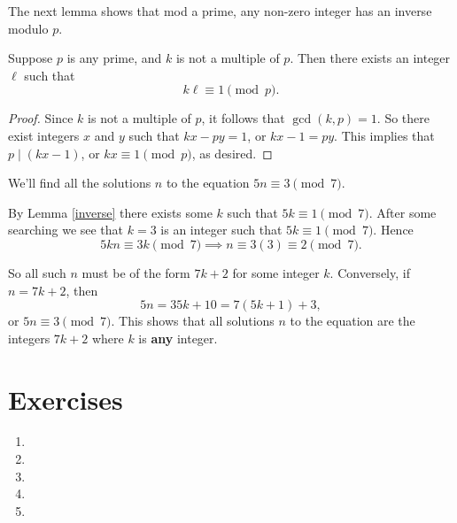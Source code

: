 The next lemma shows that mod a prime, any non-zero integer has an inverse modulo $p$.

\begin{lemma} \label{inverse}
Suppose $p$ is any prime, and $k$ is not a multiple of $p$. Then there exists an integer $\ell$ such that 
\[k \ell \equiv 1 \pmod{p}.\]
\end{lemma}

\begin{proof}
Since $k$ is not a multiple of $p$, it follows that $\gcd(k, p) = 1$. So there exist integers $x$ and $y$ such that $kx - py = 1$, or $kx - 1 = py$. This implies that $p \mid (kx - 1)$, or $kx \equiv 1 \pmod{p}$, as desired.
\end{proof}

\begin{example}
We'll find all the solutions $n$ to the equation $5n \equiv 3 \pmod{7}$.
\begin{tcolorbox}
 By Lemma \ref{inverse} there exists some $k$ such that $5k \equiv 1 \pmod{7}$. After some searching we see that $k = 3$ is an integer such that $5k \equiv 1 \pmod{7}$. Hence
 \[5kn \equiv 3k \pmod{7} \implies n \equiv 3(3) \equiv 2 \pmod{7}.\]
 
 So all such $n$ must be of the form $7k + 2$ for some integer $k$. Conversely, if $n = 7k + 2$, then 
 \[5n = 35k + 10 = 7(5k + 1) + 3,\] or $5n \equiv 3 \pmod{7}$. This shows that all solutions $n$ to the equation are the integers $7k + 2$ where $k$ is \textbf{any} integer.
\end{tcolorbox}
\end{example}

\section{Exercises}
 \begin{enumerate}
   \item 
   \item 
   \item 
   \item 
   \item 
 \end{enumerate}


